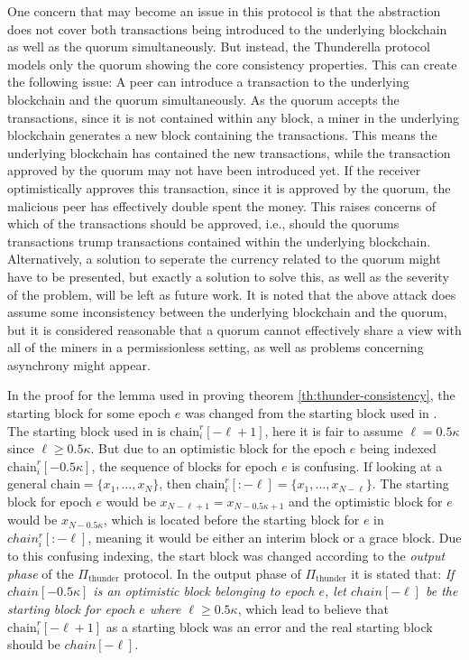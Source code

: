 One concern that may become an issue in this protocol is that the abstraction does not cover both transactions being introduced to the underlying blockchain as well as the quorum simultaneously. But instead, the Thunderella protocol \cite{thunderella} models only the quorum showing the core consistency properties. This can create the following issue: A peer can introduce a transaction to the underlying blockchain and the quorum simultaneously. As the quorum accepts the transactions, since it is not contained within any block, a miner in the underlying blockchain generates a new block containing the transactions. This means the underlying blockchain has contained the new transactions, while the transaction approved by the quorum may not have been introduced yet. If the receiver optimistically approves this transaction, since it is approved by the quorum, the malicious peer has effectively double spent the money. This raises concerns of which of the transactions should be approved, i.e., should the quorums transactions trump transactions contained within the underlying blockchain. Alternatively, a solution to seperate the currency related to the quorum might have to be presented, but exactly a solution to solve this, as well as the severity of the problem, will be left as future work. It is noted that the above attack does assume some inconsistency between the underlying blockchain and the quorum, but it is considered reasonable that a quorum cannot effectively share a view with all of the miners in a permissionless setting, as well as problems concerning asynchrony might appear.


In the proof for the lemma used in proving theorem \ref{th:thunder-consistency}, the starting block for some epoch $e$ was changed from the starting block used in \cite{thunderella}. The starting block used in \cite{thunderella} is $\text{chain}^r_i[-\ell+1]$, here it is fair to assume $\ell=0.5\kappa$ since $\ell \geq 0.5\kappa$. But due to an optimistic block for the epoch $e$ being indexed $\text{chain}^r_i[-0.5\kappa]$, the sequence of blocks for epoch $e$ is confusing. If looking at a general $\text{chain}=\{x_1, \dots, x_N\}$, then $\text{chain}^r_i[:-\ell] = \{x_1, \ldots, x_{N-\ell}\}$. The starting block for epoch $e$ would be $x_{N-\ell+1}=x_{N-0.5\kappa+1}$ and the optimistic block for $e$ would be $x_{N-0.5\kappa}$, which is located before the starting block for $e$ in $chain^r_i[:-\ell]$, meaning it would be either an interim block or a grace block. Due to this confusing indexing, the start block was changed according to the \emph{output phase} of the $\Pi_\text{thunder}$ protocol. In the output phase of $\Pi_\text{thunder}$ it is stated that: \emph{If $chain[-0.5\kappa]$ is an optimistic block belonging to epoch $e$, let $chain[-\ell]$ be the starting block for epoch $e$ where $\ell \geq 0.5\kappa$}, which lead to believe that $\text{chain}^r_i[-\ell+1]$ as a starting block was an error and the real starting block should be $chain[-\ell]$.

